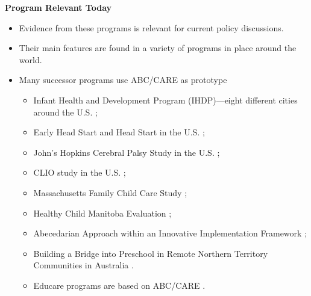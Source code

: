 \documentclass[static]{JJH-Beamer}
\begin{document}
\begin{frame}

\begin{center}
\textbf{Program Relevant Today}
\end{center}

\begin{itemize}
\item Evidence from these programs is relevant for current policy discussions.
\item Their main features are found in a variety of programs in place around the world.
\item Many successor programs use ABC/CARE as prototype
        \begin{itemize}
        \item Infant Health and Development Program (IHDP)---eight different cities around the U.S. \citep{Spiker-etal_1997_Helping};
        \item Early Head Start and Head Start in the U.S. \citep{Schneider_McDonald-eds_2007_Scale-Up_Vol-1};
        \item John's Hopkins Cerebral Palsy Study in the U.S. \citep{Sparling_2010_Highlights};
        \item CLIO study in the U.S. \citep{Sparling_2010_Highlights};
        \item Massachusetts Family Child Care Study \citep{Collins_etal_2010_Massachusetts-Study};
        \item Healthy Child Manitoba Evaluation \citep{Healthy_Child_Manitoba_2015_Starting-Early};
        \item Abecedarian Approach within an Innovative Implementation Framework \citep{Jensen_Nielsen_2016_ABC-Programme-Pilot};
        \item Building a Bridge into Preschool in Remote Northern Territory Communities in Australia \citep{UMonash_Dataset_2015_URL}.
        \item Educare programs are based on ABC/CARE \citep{Educare_2014_Research_Agenda,Yazejian_Bryant_2012_Educare}.
        \end{itemize}
\end{itemize}

\end{frame}
\end{document}
